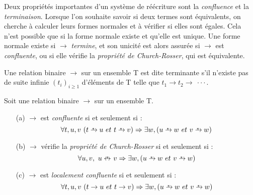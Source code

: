 Deux propriétés importantes d'un système de réécriture sont la
\emph{confluence} et la \emph{terminaison}. Lorsque l'on souhaite savoir si
deux termes sont équivalents, on cherche à calculer leurs formes normales et à
vérifier si elles sont égales. Cela n'est possible que si la forme normale
existe et qu'elle est unique. Une forme normale existe si $\rightarrow$
\emph{termine}, et son unicité est alors assurée si $\rightarrow$ est
\emph{confluente}, ou si elle vérifie la \emph{propriété de Church-Rosser}, qui
est équivalente.

\begin{definition}[Terminaison]
Une relation binaire $\rightarrow$ sur un ensemble T est dite terminante s'il
n'existe pas de suite infinie $(t_i)_{i\ge 1}$ d'éléments de T telle que $t_1
\rightarrow t_2 \rightarrow~\cdotp\cdotp\cdotp$.
\end{definition}

\begin{definition}[Confluence]
Soit une relation binaire $\rightarrow$ sur un ensemble T. %
\begin{itemize}
  \item[(a)] $\rightarrow$ est \emph{confluente} si et seulement si :
    $$\forall t,u,v ~(t \refltransclo u~et~t \refltransclo v) \Rightarrow
    \exists w, (u \refltransclo w~et~v \refltransclo w)$$
  \item[(b)] $\rightarrow$ vérifie la \emph{propriété de Church-Rosser} si et seulement si :
    $$\forall u,v,~u \symrefltransclo v \Rightarrow
    \exists w, (u \refltransclo w~et~v \refltransclo w)$$
\item[(c)] $\rightarrow$ est \emph{localement confluente} si et seulement si :
    $$\forall t,u,v ~(t \rightarrow u~et~t \rightarrow v) \Rightarrow
    \exists w, (u \mathrel{\mbox{$\rightarrow$\hspace{-0.8em}{\footnotesize $^*$}$~$}} w~et~v \mathrel{\mbox{$\rightarrow$\hspace{-0.8em}{\footnotesize $^*$}$~$}} w)$$
\end{itemize}
\end{definition}

%  

